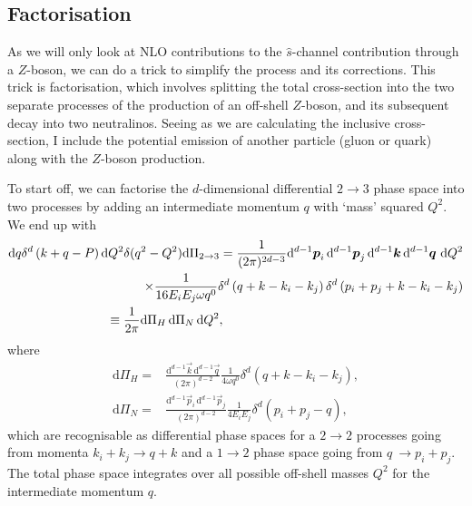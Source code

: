 \documentclass[../main.tex]{subfiles}
\begin{document}
\subsection{Factorisation}
As we will only look at NLO contributions to the \(\hat{s}\)-channel contribution through a \(Z\)-boson, we can do a trick to simplify the process and its corrections.
This trick is factorisation, which involves splitting the total cross-section into the two separate processes of the production of an off-shell \(Z\)-boson, and its subsequent decay into two neutralinos.
Seeing as we are calculating the inclusive cross-section, I include the potential emission of another particle (gluon or quark) along with the \(Z\)-boson production.

To start off, we can factorise the \(d\)-dimensional differential \(2\to 3\) phase space into two processes by adding an intermediate momentum \(q\) with `mass' squared \(Q^2\).
We end up with
\begin{align}
  \label{pc:eq:dPi_factorised}
  \nonumber
  \mathrm{d}q \delta^d\pclosed{k+q-P} \mathrm{d}Q^2 \delta(q^2-Q^2) \mathrm{d}\Pi_{2\to 3} = \frac{1}{(2\pi)^{2d-3}}\mathrm{d}^{d-1}\vec{p}_i\,\mathrm{d}^{d-1}\vec{p}_j\,\mathrm{d}^{d-1}\vec{k}\,\mathrm{d}^{d-1}\vec{q}\,\,\mathrm{d}Q^2 \\
  \nonumber
  \times \frac{1}{16E_iE_j\omega q^0} \delta^d\pclosed{q+k - k_i-k_j}\delta^d\pclosed{p_i+p_j+k - k_i-k_j}                                                                                                                                  \\
  \equiv \frac{1}{2\pi} \mathrm{d}\Pi_H\, \mathrm{d}\Pi_N\, \mathrm{d}Q^2,\hspace{6.7cm}
\end{align}
where
\begin{subequations}
  \begin{align}
    \label{pc:eq:Pi_H}
    \mathrm{d}\Pi_H = & \frac{\mathrm{d}^{d-1}\vec{k}\, \mathrm{d}^{d-1}\vec{q}}{(2\pi)^{d-2}} \frac{1}{4\omega q^0} \delta^d(q+k-k_i-k_j), \\
    \label{pc:eq:Pi_N}
    \mathrm{d}\Pi_N = & \frac{\mathrm{d}^{d-1}\vec{p}_i\, \mathrm{d}^{d-1}\vec{p}_j}{(2\pi)^{d-2}} \frac{1}{4E_iE_j} \delta^d(p_i+p_j-q),
  \end{align}
\end{subequations}
which are recognisable as differential phase spaces for a \(2\to 2\) processes going from momenta \(k_i+k_j \to q+k\) and a \(1\to 2\) phase space going from \(q\ \to p_i+p_j\).
The total phase space integrates over all possible off-shell masses \(Q^2\) for the intermediate momentum \(q\).
\end{document}
